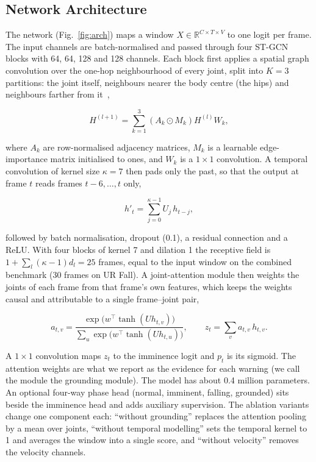 \documentclass[journal]{IEEEtran}
\begin{document}
\subsection{Network Architecture}\label{sub:model}

The network (Fig.~\ref{fig:arch}) maps a window $X \in \mathbb{R}^{C\times T\times V}$ to one logit per frame. The input channels are batch-normalised and passed through four ST-GCN blocks with 64, 64, 128 and 128 channels. Each block first applies a spatial graph convolution over the one-hop neighbourhood of every joint, split into $K=3$ partitions: the joint itself, neighbours nearer the body centre (the hips) and neighbours farther from it~\cite{stgcn},

\begin{equation}
\label{eq:gconv}
H^{(l+1)} = \sum_{k=1}^{3} \left(A_k \odot M_k\right) H^{(l)} W_k,
\end{equation}


where $A_k$ are row-normalised adjacency matrices, $M_k$ is a learnable edge-importance matrix initialised to ones, and $W_k$ is a $1\times 1$ convolution. A temporal convolution of kernel size $\kappa = 7$ then pads only the past, so that the output at frame $t$ reads frames $t-6,\dots,t$ only,

\begin{equation}
\label{eq:tconv}
h'_t = \sum_{j=0}^{\kappa-1} U_j\, h_{t-j},
\end{equation}


followed by batch normalisation, dropout (0.1), a residual connection and a ReLU. With four blocks of kernel 7 and dilation 1 the receptive field is $1+\sum_l(\kappa-1)d_l = 25$ frames, equal to the input window on the combined benchmark (30 frames on UR Fall). A joint-attention module then weights the joints of each frame from that frame's own features, which keeps the weights causal and attributable to a single frame--joint pair,

\begin{equation}
\label{eq:attn}
a_{t,v}=\frac{\exp\!\big(w^{\top}\tanh(U h_{t,v})\big)}{\sum_{u}\exp\!\big(w^{\top}\tanh(U h_{t,u})\big)},\qquad z_t=\sum_{v}a_{t,v}\,h_{t,v}.
\end{equation}


A $1\times 1$ convolution maps $z_t$ to the imminence logit and $p_t$ is its sigmoid. The attention weights are what we report as the evidence for each warning (we call the module the grounding module). The model has about 0.4 million parameters. An optional four-way phase head (normal, imminent, falling, grounded) sits beside the imminence head and adds auxiliary supervision. The ablation variants change one component each: ``without grounding'' replaces the attention pooling by a mean over joints, ``without temporal modelling'' sets the temporal kernel to 1 and averages the window into a single score, and ``without velocity'' removes the velocity channels.
\end{document}
